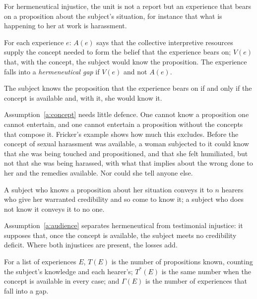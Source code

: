 \documentclass{situationist-preprint}
\begin{document}
For hermeneutical injustice, the unit is not a report but an experience that bears on a proposition about the subject's situation, for instance that what is happening to her at work is harassment.

\begin{definition}\label{d:gap}
For each experience $e$: $A(e)$ says that the collective interpretive resources supply the concept needed to form the belief that the experience bears on; $V(e)$ that, with the concept, the subject would know the proposition. The experience falls into a \emph{hermeneutical gap} if $V(e)$ and not $A(e)$.
\end{definition}

\begin{assumption}\label{a:concept}
The subject knows the proposition that the experience bears on if and only if the concept is available and, with it, she would know it.
\end{assumption}

Assumption~\ref{a:concept} needs little defence. One cannot know a proposition one cannot entertain, and one cannot entertain a proposition without the concepts that compose it. Fricker's example shows how much this excludes. Before the concept of sexual harassment was available, a woman subjected to it could know that she was being touched and propositioned, and that she felt humiliated, but not that she was being harassed, with what that implies about the wrong done to her and the remedies available. Nor could she tell anyone else.

\begin{assumption}[Audience]\label{a:audience}
A subject who knows a proposition about her situation conveys it to $n$ hearers who give her warranted credibility and so come to know it; a subject who does not know it conveys it to no one.
\end{assumption}

Assumption~\ref{a:audience} separates hermeneutical from testimonial injustice: it supposes that, once the concept is available, the subject meets no credibility deficit. Where both injustices are present, the losses add.

\begin{definition}\label{d:total}
For a list of experiences $E$, $T(E)$ is the number of propositions known, counting the subject's knowledge and each hearer's; $T^{*}(E)$ is the same number when the concept is available in every case; and $\Gamma(E)$ is the number of experiences that fall into a gap.
\end{definition}
\end{document}
